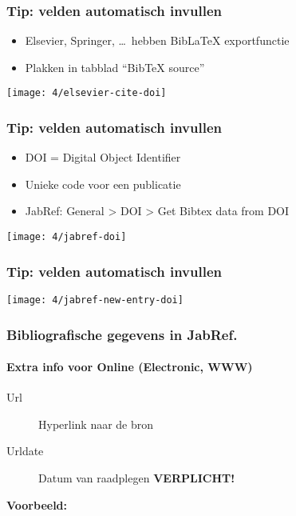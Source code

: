 \documentclass[aspectratio=169]{beamer}
\begin{document}
\begin{frame}
  \frametitle{Tip: velden automatisch invullen}

  \begin{itemize}
    \item Elsevier, Springer, \ldots\ hebben Bib\LaTeX{} exportfunctie
    \item Plakken in tabblad ``BibTeX source''
  \end{itemize}

  \bigskip

  \centering
  \texttt{[image: 4/elsevier-cite-doi]}

\end{frame}

\begin{frame}
  \frametitle{Tip: velden automatisch invullen}

  \begin{itemize}
    \item DOI = Digital Object Identifier
    \item Unieke code voor een publicatie
    \item JabRef: General > DOI > Get Bibtex data from DOI
  \end{itemize}

  \bigskip

  \centering
  \texttt{[image: 4/jabref-doi]}

\end{frame}

\begin{frame}[plain]
  \frametitle{Tip: velden automatisch invullen}

  \centering
  \texttt{[image: 4/jabref-new-entry-doi]}

\end{frame}

\begin{frame}[plain]
  \frametitle{Bibliografische gegevens in JabRef.}
  \framesubtitle{Extra info voor Online (Electronic, WWW)}

  \begin{description}
    \item[Url] Hyperlink naar de bron
    \item[Urldate] Datum van raadplegen \textbf{VERPLICHT!}
  \end{description}

  \bigskip

  \textbf{Voorbeeld:}

  \bigskip


\end{frame}
\end{document}
